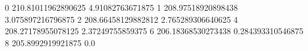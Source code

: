 0 210.81011962890625 4.91082763671875
1 208.97518920898438 3.075897216796875
2 208.66458129882812 2.765289306640625
4 208.27178955078125 2.37249755859375
6 206.18368530273438 0.284393310546875
8 205.8992919921875 0.0
